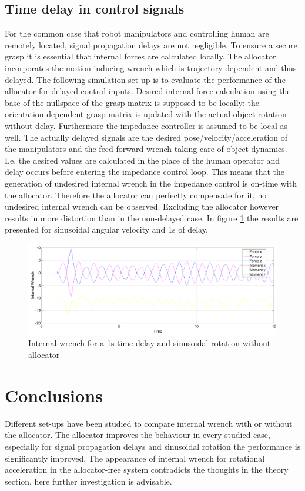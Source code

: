 \documentclass[conference]{IEEEtran}
\begin{document}
\subsection{Time delay in control signals}
For the common case that robot manipulators and controlling human are remotely located, signal propagation delays are not negligible. To ensure a secure grasp it is essential that internal forces are calculated locally. The allocator incorporates the motion-inducing wrench which is trajectory dependent and thus delayed. The following simulation set-up is to evaluate the performance of the allocator for delayed control inputs. Desired internal force calculation using the base of the nullspace of the grasp matrix is supposed to be locally: the orientation dependent grasp matrix is updated with the actual object rotation without delay. Furthermore the impedance controller is assumed to be local as well. The actually delayed signals are the desired pose/velocity/acceleration of the manipulators and the feed-forward wrench taking care of object dynamics. I.e. the desired values are calculated in the place of the human operator and delay occurs before entering the impedance control loop. This means that the generation of undesired internal wrench in the impedance control is on-time with the allocator. Therefore the allocator can perfectly compensate for it, no undesired internal wrench can be observed. Excluding the allocator however results in more distortion than in the non-delayed case. In figure \ref{IntDelay} the results are presented for sinusoidal angular velocity and 1s of delay.       
\begin{figure}
\includegraphics[width=\linewidth]{IntDelay}
\caption{Internal wrench for a 1s time delay and sinusoidal rotation without allocator}
\label{IntDelay}
\end{figure}

\section{Conclusions}
Different set-ups have been studied to compare internal wrench with or without the allocator. The allocator improves the behaviour in every studied case, especially for signal propagation delays and sinusoidal rotation the performance is significantly improved. The appearance of internal wrench for rotational acceleration in the allocator-free system contradicts the thoughts in the theory section, here further investigation is advisable. 







\end{document}
